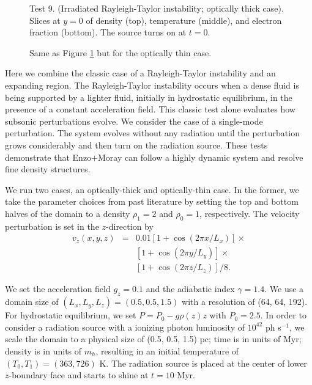 \documentclass[useAMS,usenatbib]{mn2e}
\begin{document}
\begin{figure}
  \caption{\label{fig:test9_thick} Test 9. (Irradiated Rayleigh-Taylor
    instability; optically thick case).  Slices at $y=0$ of density
    (top), temperature (middle), and electron fraction (bottom).  The
    source turns on at $t=0$.}
\end{figure}

\begin{figure}
  \caption{\label{fig:test9_thin} Same as Figure \ref{fig:test9_thick}
    but for the optically thin case.}
\end{figure}

Here we combine the classic case of a Rayleigh-Taylor instability and
an expanding \hii region.  The Rayleigh-Taylor instability
occurs when a dense fluid is being supported by a lighter fluid,
initially in hydrostatic equilibrium, in the presence of a constant
acceleration field.  This classic test alone evaluates how subsonic
perturbations evolve.  We consider the case of a single-mode
perturbation.  The system evolves without any radiation until the
perturbation grows considerably and then turn on the radiation source.
These tests demonstrate that Enzo+Moray can follow a highly dynamic
system and resolve fine density structures.

We run two cases, an optically-thick and optically-thin case.  In
the former, we take the parameter choices from past literature
\citep[e.g.][]{Liska03, Stone08} by setting the top and bottom halves
of the domain to a density $\rho_1 = 2$ and $\rho_0 = 1$,
respectively.  The velocity perturbation is set in the $z$-direction
by
\begin{eqnarray}
  v_z(x,y,z) & = & 0.01 [1 + \cos(2\pi x / L_x)] \times  \nonumber\\
  & & [1 + \cos(2\pi y / L_y)] \times \nonumber\\
  & & [1 + \cos(2\pi z / L_z)]/8.
\end{eqnarray}

We set the acceleration field $g_z = 0.1$ and the adiabatic index
$\gamma = 1.4$.  We use a domain size of $(L_x, L_y, L_z) = (0.5, 0.5,
1.5)$ with a resolution of (64, 64, 192).  For hydrostatic
equilibrium, we set $P = P_0 - g \rho(z) z$ with $P_0 = 2.5$.  In
order to consider a radiation source with a ionizing photon luminosity
of $10^{42}$ ph s$^{-1}$, we scale the domain to a physical size of
(0.5, 0.5, 1.5) pc; time is in units of Myr; density is in units of
$m_h$, resulting in an initial temperature of $(T_0, T_1) = (363,
726)$ K.  The radiation source is placed at the center of lower
$z$-boundary face and starts to shine at $t = 10$ Myr.
\end{document}
